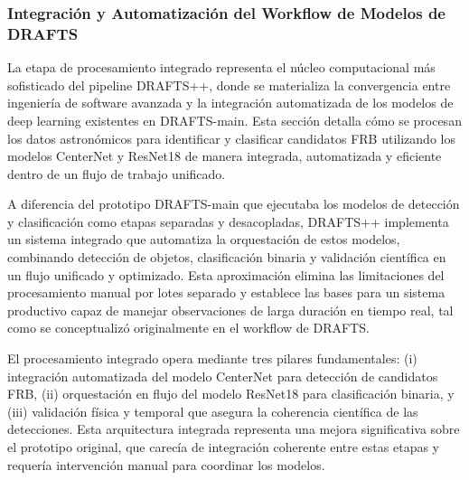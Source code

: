 \subsubsection{Integración y Automatización del Workflow de Modelos de DRAFTS}

La etapa de procesamiento integrado representa el núcleo computacional más sofisticado del pipeline DRAFTS++, donde se materializa la convergencia entre ingeniería de software avanzada y la integración automatizada de los modelos de deep learning existentes en DRAFTS-main. Esta sección detalla cómo se procesan los datos astronómicos para identificar y clasificar candidatos FRB utilizando los modelos CenterNet y ResNet18 de manera integrada, automatizada y eficiente dentro de un flujo de trabajo unificado.

A diferencia del prototipo DRAFTS-main que ejecutaba los modelos de detección y clasificación como etapas separadas y desacopladas, DRAFTS++ implementa un sistema integrado que automatiza la orquestación de estos modelos, combinando detección de objetos, clasificación binaria y validación científica en un flujo unificado y optimizado. Esta aproximación elimina las limitaciones del procesamiento manual por lotes separado y establece las bases para un sistema productivo capaz de manejar observaciones de larga duración en tiempo real, tal como se conceptualizó originalmente en el workflow de DRAFTS.

El procesamiento integrado opera mediante tres pilares fundamentales: (i) integración automatizada del modelo CenterNet para detección de candidatos FRB, (ii) orquestación en flujo del modelo ResNet18 para clasificación binaria, y (iii) validación física y temporal que asegura la coherencia científica de las detecciones. Esta arquitectura integrada representa una mejora significativa sobre el prototipo original, que carecía de integración coherente entre estas etapas y requería intervención manual para coordinar los modelos.

